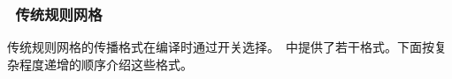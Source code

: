 \vssub
\subsubsection{~传统规则网格} \label{sub:num_space_trad}

\noindent
传统规则网格的传播格式在编译时通过开关选择。\ws\ 中提供了若干格式。下面按复杂程度递增的顺序介绍这些格式。
